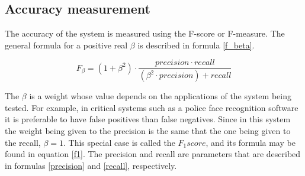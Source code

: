 

		\subsection{Accuracy measurement}
		\label{accuracy_measurement}

		The accuracy of the system is measured using the F-score or F-measure. 
		The general formula for a positive real $\beta$ is described in formula \ref{f_beta}. 
		\begin{center}
		\begin{equation}
		\label{f_beta}
		F_\beta=(1+\beta^2)\cdot\frac{precision \cdot recall}{(\beta^2 \cdot precision )+recall}
		\end{equation}
		\end{center}

		The $\beta$ is a weight whose value depends on the applications of the system being tested. 
		For example, in critical systems such as a police face recognition software it is preferable to have false positives than false negatives.
		Since in this system the weight being given to the precision is the same that the one being given to the recall, $\beta=1$. 
		This special case is called the $F_1 score$, and its formula may be found in equation \ref{f1}.
		The precision and recall are parameters that are described in formulas \ref{precision} and \ref{recall}, respectively. 
	
